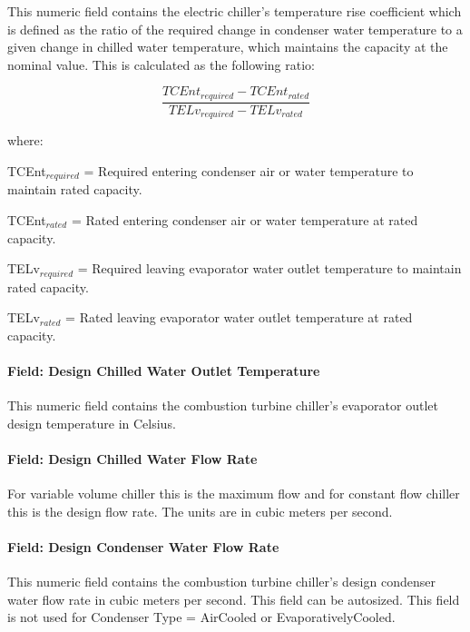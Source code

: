 This numeric field contains the electric chiller's temperature rise coefficient which is defined as the ratio of the required change in condenser water temperature to a given change in chilled water temperature, which maintains the capacity at the nominal value. This is calculated as the following ratio:

\begin{equation}
\frac{{TCEn{t_{required}} - TCEn{t_{rated}}}}{{TEL{v_{required}} - TEL{v_{rated}}}}
\end{equation}

where:

TCEnt\(_{required}\) = Required entering condenser air or water temperature to maintain rated capacity.

TCEnt\(_{rated}\) = Rated entering condenser air or water temperature at rated capacity.

TELv\(_{required}\) = Required leaving evaporator water outlet temperature to maintain rated capacity.

TELv\(_{rated}\) = Rated leaving evaporator water outlet temperature at rated capacity.

\paragraph{Field: Design Chilled Water Outlet Temperature}\label{field-design-chilled-water-outlet-temperature-2}

This numeric field contains the combustion turbine chiller's evaporator outlet design temperature in Celsius.

\paragraph{Field: Design Chilled Water Flow Rate}\label{field-design-chilled-water-flow-rate-5}

For variable volume chiller this is the maximum flow and for constant flow chiller this is the design flow rate. The units are in cubic meters per second.

\paragraph{Field: Design Condenser Water Flow Rate}\label{field-design-condenser-water-flow-rate-4}

This numeric field contains the combustion turbine chiller's design condenser water flow rate in cubic meters per second. This field can be autosized. This field is not used for Condenser Type = AirCooled or EvaporativelyCooled.

